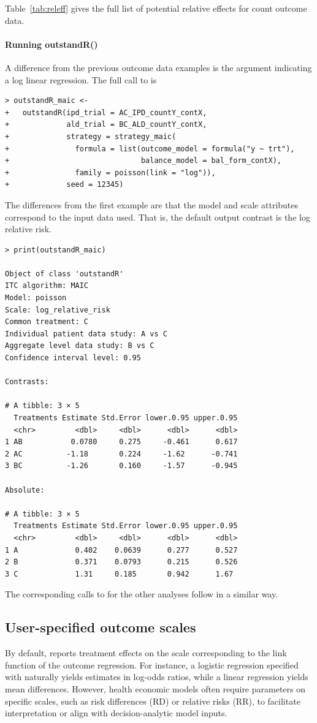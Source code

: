\documentclass[article]{jss}
\begin{document}
Table~\ref{tab:releff} gives the full list of potential relative effects for count outcome data.

\paragraph{Running outstandR()}
A difference from the previous outcome data examples is the  argument indicating a log linear regression. The full call to  is

\begin{verbatim}
> outstandR_maic <-
+   outstandR(ipd_trial = AC_IPD_countY_contX,
+             ald_trial = BC_ALD_countY_contX,
+             strategy = strategy_maic(
+               formula = list(outcome_model = formula("y ~ trt"),
+                              balance_model = bal_form_contX),
+               family = poisson(link = "log")),
+             seed = 12345)
\end{verbatim}

The differences from the first example are that the model and scale attributes correspond to the input data used. That is, the default output contrast is the log relative risk.

\begin{verbatim}
> print(outstandR_maic)

Object of class 'outstandR' 
ITC algorithm: MAIC 
Model: poisson 
Scale: log_relative_risk 
Common treatment: C 
Individual patient data study: A vs C 
Aggregate level data study: B vs C 
Confidence interval level: 0.95 

Contrasts:

# A tibble: 3 × 5
  Treatments Estimate Std.Error lower.0.95 upper.0.95
  <chr>         <dbl>     <dbl>      <dbl>      <dbl>
1 AB           0.0780     0.275     -0.461      0.617
2 AC          -1.18       0.224     -1.62      -0.741
3 BC          -1.26       0.160     -1.57      -0.945

Absolute:

# A tibble: 3 × 5
  Treatments Estimate Std.Error lower.0.95 upper.0.95
  <chr>         <dbl>     <dbl>      <dbl>      <dbl>
1 A             0.402    0.0639      0.277      0.527
2 B             0.371    0.0793      0.215      0.526
3 C             1.31     0.185       0.942      1.67 
\end{verbatim}
The corresponding calls to  for the other analyses follow in a similar way.

\subsection{User-specified outcome scales}
By default,  reports treatment effects on the scale corresponding to the link function of the outcome regression. For instance, a logistic regression specified with  naturally yields estimates in log-odds ratios, while a linear regression yields mean differences. However, health economic models often require parameters on specific scales, such as risk differences (RD) or relative risks (RR), to facilitate interpretation or align with decision-analytic model inputs.
\end{document}
